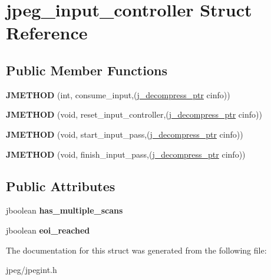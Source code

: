 \hypertarget{structjpeg__input__controller}{}\section{jpeg\+\_\+input\+\_\+controller Struct Reference}
\label{structjpeg__input__controller}
\subsection*{Public Member Functions}
\begin{DoxyCompactItemize}
\item 
{\bfseries J\+M\+E\+T\+H\+OD} (int, consume\+\_\+input,(\hyperlink{structjpeg__decompress__struct}{j\+\_\+decompress\+\_\+ptr} cinfo))\hypertarget{structjpeg__input__controller_af742c796479db5dd8b3275307d76a103}{}\label{structjpeg__input__controller_af742c796479db5dd8b3275307d76a103}

\item 
{\bfseries J\+M\+E\+T\+H\+OD} (void, reset\+\_\+input\+\_\+controller,(\hyperlink{structjpeg__decompress__struct}{j\+\_\+decompress\+\_\+ptr} cinfo))\hypertarget{structjpeg__input__controller_aa2720adb6f991abedb2e8c03804cac4f}{}\label{structjpeg__input__controller_aa2720adb6f991abedb2e8c03804cac4f}

\item 
{\bfseries J\+M\+E\+T\+H\+OD} (void, start\+\_\+input\+\_\+pass,(\hyperlink{structjpeg__decompress__struct}{j\+\_\+decompress\+\_\+ptr} cinfo))\hypertarget{structjpeg__input__controller_aef985c09924396a078c67592da47d679}{}\label{structjpeg__input__controller_aef985c09924396a078c67592da47d679}

\item 
{\bfseries J\+M\+E\+T\+H\+OD} (void, finish\+\_\+input\+\_\+pass,(\hyperlink{structjpeg__decompress__struct}{j\+\_\+decompress\+\_\+ptr} cinfo))\hypertarget{structjpeg__input__controller_a70620c8e0ea8fd2f7b0243cd9bf395e1}{}\label{structjpeg__input__controller_a70620c8e0ea8fd2f7b0243cd9bf395e1}

\end{DoxyCompactItemize}
\subsection*{Public Attributes}
\begin{DoxyCompactItemize}
\item 
jboolean {\bfseries has\+\_\+multiple\+\_\+scans}\hypertarget{structjpeg__input__controller_a2c5a3bc8add38a585fe463038649a411}{}\label{structjpeg__input__controller_a2c5a3bc8add38a585fe463038649a411}

\item 
jboolean {\bfseries eoi\+\_\+reached}\hypertarget{structjpeg__input__controller_a8b529d5bbdc92f8292467820a0ec7496}{}\label{structjpeg__input__controller_a8b529d5bbdc92f8292467820a0ec7496}

\end{DoxyCompactItemize}


The documentation for this struct was generated from the following file\+:\begin{DoxyCompactItemize}
\item 
jpeg/jpegint.\+h\end{DoxyCompactItemize}
